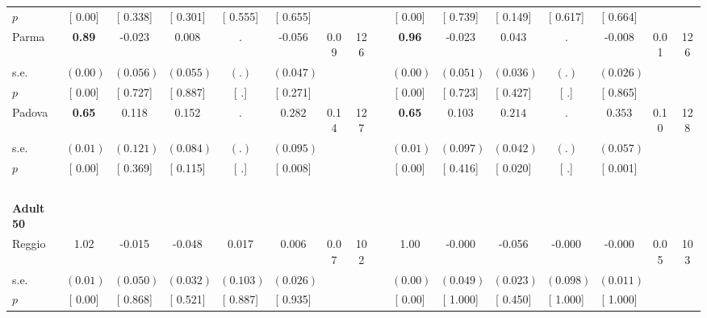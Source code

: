 \begin{longtable}{L{8em} c c c c c c c p{1em} c c c c c c c}
\quad \quad \quad \quad $ p$ & [     0.00] & [    0.338] & [    0.301] & [    0.555] & [    0.655] & & & & [     0.00] & [    0.739] & [    0.149] & [    0.617] & [    0.664] & &  \\[1em]
\quad \quad \quad Parma& \textbf{     0.89} &    -0.023 &     0.008 &         . &    -0.056 &      0.09 &       126 & & \textbf{     0.96} &    -0.023 &     0.043 &         . &    -0.008 &      0.01 &       126  \\*
\quad \quad \quad \quad s.e.& $ (     0.00)$ & $ (    0.056)$ & $ (    0.055)$ & $ (        .)$ & $ (    0.047)$ & & & & $ (     0.00)$ & $ (    0.051)$ & $ (    0.036)$ & $ (        .)$ & $ (    0.026)$ & &  \\*
\quad \quad \quad \quad $ p$ & [     0.00] & [    0.727] & [    0.887] & [        .] & [    0.271] & & & & [     0.00] & [    0.723] & [    0.427] & [        .] & [    0.865] & &  \\[1em]
\quad \quad \quad Padova& \textbf{     0.65} &     0.118 &     0.152 &         . & $ \mathbf{    0.282}$ &      0.14 &       127 & & \textbf{     0.65} &     0.103 & $ \mathbf{    0.214}$ &         . & $ \mathbf{    0.353}$ &      0.10 &       128  \\*
\quad \quad \quad \quad s.e.& $ (     0.01)$ & $ (    0.121)$ & $ (    0.084)$ & $ (        .)$ & $ (    0.095)$ & & & & $ (     0.01)$ & $ (    0.097)$ & $ (    0.042)$ & $ (        .)$ & $ (    0.057)$ & &  \\*
\quad \quad \quad \quad $ p$ & [     0.00] & [    0.369] & [    0.115] & [        .] & [    0.008] & & & & [     0.00] & [    0.416] & [    0.020] & [        .] & [    0.001] & &  \\[1em]
~\\[1em]
\quad \quad \textbf{Adult 50} & & & & & & & & & & & & & & & \\* 
\quad \quad \quad Reggio& 1.02 &    -0.015 &    -0.048 &     0.017 &     0.006 &      0.07 &       102 & & 1.00 &    -0.000 &    -0.056 &    -0.000 &    -0.000 &      0.05 &       103  \\*
\quad \quad \quad \quad s.e.& $ (     0.01)$ & $ (    0.050)$ & $ (    0.032)$ & $ (    0.103)$ & $ (    0.026)$ & & & & $ (     0.00)$ & $ (    0.049)$ & $ (    0.023)$ & $ (    0.098)$ & $ (    0.011)$ & &  \\*
\quad \quad \quad \quad $ p$ & [     0.00] & [    0.868] & [    0.521] & [    0.887] & [    0.935] & & & & [     0.00] & [    1.000] & [    0.450] & [    1.000] & [    1.000] & &  \\[1em]

\end{longtable}
